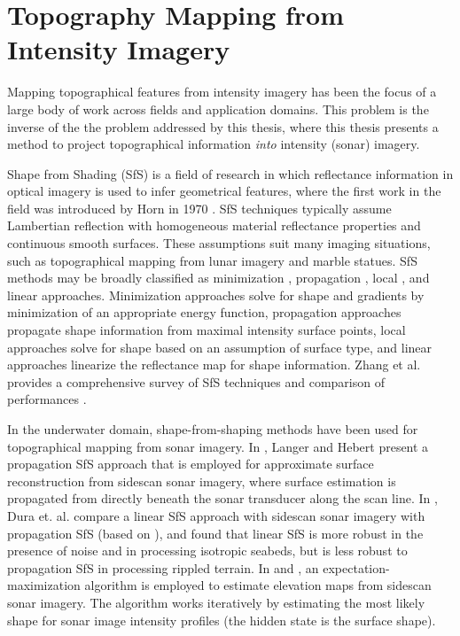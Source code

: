 \section{Topography Mapping from Intensity Imagery}
\label{related.SfS}

Mapping topographical features from intensity imagery has been the focus of a large body of work across fields and application domains.
This problem is the inverse of the the problem addressed by this thesis, where this thesis presents a method to project topographical information \emph{into} intensity (sonar) imagery.

Shape from Shading (SfS) is a field of research in which reflectance information in optical imagery is used to infer geometrical features, where the first work in the field was introduced by Horn in 1970 \cite{Horn1970}.
SfS techniques typically assume Lambertian reflection \cite{Shirley2009} with homogeneous material reflectance properties and continuous smooth surfaces.
These assumptions suit many imaging situations, such as topographical mapping from lunar imagery and marble statues.
SfS methods may be broadly classified as minimization \cite{Horn1989} \cite{Szeliski1991}, propagation \cite{Horn1970}, local \cite{Pentland1984}, and linear \cite{Tsai1994} approaches.
Minimization approaches solve for shape and gradients by minimization of an appropriate energy function, propagation approaches propagate shape information from maximal intensity surface points, local approaches solve for shape based on an assumption of surface type, and linear approaches linearize the reflectance map for shape information.
Zhang et al. provides a comprehensive survey of SfS techniques and comparison of performances \cite{Zhang1999}.

In the underwater domain, shape-from-shaping methods have been used for topographical mapping from sonar imagery.
In \cite{Langer1991}, Langer and Hebert present a propagation SfS approach that is employed for approximate surface reconstruction from sidescan sonar imagery, where surface estimation is propagated from directly beneath the sonar transducer along the scan line.
In \cite{Dura2004}, Dura et. al. compare a linear SfS approach with sidescan sonar imagery with propagation SfS (based on \cite{Langer1991}), and found that linear SfS is more robust in the presence of noise and in processing isotropic seabeds, but is less robust to propagation SfS in processing rippled terrain.
In \cite{Coiras2005} and \cite{Coiras2007}, an expectation-maximization algorithm is employed to estimate elevation maps from sidescan sonar imagery.
The algorithm works iteratively by estimating the most likely shape for sonar image intensity profiles (the hidden state is the surface shape).

